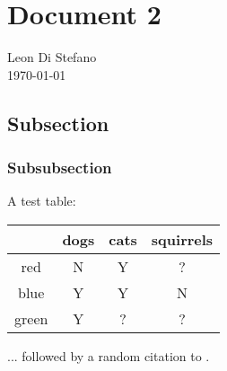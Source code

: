 \documentclass[11pt,fleqn]{article}
\begin{document}
\raggedright %

\section*{Document 2}

Leon Di Stefano \\
\today

\vspace{0.1in}

\normalsize

\subsection*{Subsection}

\subsubsection*{Subsubsection}

A test table:
\begin{center}
    \begin{tabular}{ c c c c }
                  & dogs  & cats & squirrels \\ 
     \hline
     red          & N     & Y    & ?         \\  
     blue         & Y     & Y    & N         \\
     green        & Y     & ?    & ?
    \end{tabular}
\end{center}
... followed by a random citation to
\cite{rubinTeachingStatisticalInference2004}.
\end{document}
